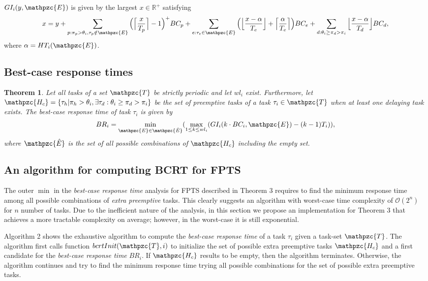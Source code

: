 \documentclass[fleqn]{article}
\newtheorem{theorem}{Theorem}
\begin{document}
$GI_i(y,  \mathpzc{E})$ is given by the largest $x \in \mathbb{R}^+$ satisfying
\begin{align}
x = y + \sum\limits_{p:\pi_p > \theta_i, \tau_p \notin \mathpzc{E}} \Big( \Big\lceil  \dfrac{x}{T_p}\Big\rceil -1 \Big)^+  BC_p + 
\sum\limits_{e:\tau_e \in \mathpzc{E}} \Big( \Big\lfloor  \dfrac{x -\alpha}{T_e}\Big\rfloor + \Big\lceil \dfrac{\alpha}{T_e} \Big\rceil \Big) BC_e +
\sum\limits_{d:\theta_i \geq \pi_d > \pi_i} \Big\lfloor  \dfrac{x-\alpha}{T_d}\Big\rfloor  BC_d,
\end{align}
where $\alpha = HT_i(\mathpzc{E})$.

\subsection{Best-case response times}

\begin{theorem}
	 Let all tasks of a set  $\mathpzc{T}$ be strictly periodic and let $wl_i$ exist. Furthermore, let  $\mathpzc{H_c} = \{\tau_h | \pi_h > \theta_i, \exists \tau_d : \theta_i \geq \pi_d > \pi_i \}$ be the set of preemptive tasks of a task $\tau_i \in \mathpzc{T}$ when at least one delaying task exists. The best-case response time of task $\tau_i$ is given by
	 \begin{align}
	 	BR_i = \min\limits_{\mathpzc{E}\in\mathpzc{\hat{E}}}(\max \limits_{1 \leq k \leq wl_i} (GI_i(k \cdot BC_i, \mathpzc{E}) - (k-1)T_i)),
	 \end{align}
	 where $\mathpzc{\hat{E}}$ is the set of all possible combinations of $\mathpzc{H_c}$ including the empty set.
\end{theorem}

\subsection{An algorithm for computing BCRT for FPTS}
The outer $\min$ in the \textit{best-case response time} analysis for FPTS described in Theorem 3 requires to find the minimum response time among all possible combinations of \textit{extra preemptive} tasks. This clearly suggests an algorithm with worst-case time complexity of $\mathcal{O}(2^n)$ for $n$ number of tasks. Due to the inefficient nature of the analysis, in this section we propose an implementation for Theorem 3 that achieves a more tractable complexity on average; however, in the worst-case it is still exponential.

Algorithm 2 shows the exhaustive algorithm to compute the \textit{best-case response time} of a task $\tau_i$ given a task-set $\mathpzc{T}$. The algorithm first calls function $bcrtInit(\mathpzc{T},i)$ to initialize the set of possible extra preemptive tasks $\mathpzc{H_c}$ and a first candidate for the \textit{best-case response time} $BR_i$. If $\mathpzc{H_c}$ results to be empty, then the algorithm terminates. Otherwise, the algorithm continues and try to find the minimum response time trying all possible combinations for the set of possible extra preemptive tasks.
\end{document}
